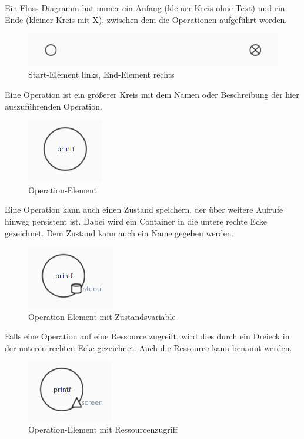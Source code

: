 \subsubsection{\textFlowElements}
\label{\textFlowElements}

Ein Fluss Diagramm hat immer ein Anfang (kleiner Kreis ohne Text) und ein Ende (kleiner Kreis mit X), zwischen dem
die Operationen aufgeführt werden.
\begin{figure}[H]
	\centering
	\includegraphics[width=\maxwidth{.9\textwidth}]{Element_Start_End.png}
	\caption{Start-Element links, End-Element rechts}
\end{figure}


Eine Operation ist ein größerer Kreis mit dem Namen oder Beschreibung der hier auszuführenden Operation.
\begin{figure}[H]
	\centering
	\includegraphics[width=\maxwidth{.9\textwidth}]{Element_Operation.png}
	\caption{Operation-Element}
\end{figure}

Eine Operation kann auch einen Zustand speichern, der über weitere Aufrufe hinweg persistent ist. Dabei wird 
ein Container in die untere rechte Ecke gezeichnet. Dem Zustand kann auch ein Name gegeben werden.
\begin{figure}[H]
	\centering
	\includegraphics[width=\maxwidth{.9\textwidth}]{Element_Operation_Zustand.png}
	\caption{Operation-Element mit Zustandsvariable}
\end{figure}

\pagebreak
Falls eine Operation auf eine Ressource zugreift, wird dies durch ein Dreieck in der unteren rechten Ecke gezeichnet.
Auch die Ressource kann benannt werden.
\begin{figure}[H]
	\centering
	\includegraphics[width=\maxwidth{.9\textwidth}]{Element_Operation_Resource.png}
	\caption{Operation-Element mit Ressourcenzugriff}
\end{figure}

